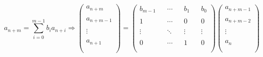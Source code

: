$$
	a_{n+m}=\sum_{i=0}^{m-1}b_ia_{n+i}\Rightarrow
	\left(
	\begin{matrix}
			a_{n+m}   \\\\
			a_{n+m-1} \\\\
			\vdots    \\\\
			a_{n+1}   \\\\
		\end{matrix}
	\right)
	=
	\left(
	\begin{matrix}
			b_{m-1} &  & \cdots &  & b_1    &  & b_0    \\\\
			1       &  & \cdots &  & 0      &  & 0      \\\\
			\vdots  &  & \ddots &  & \vdots &  & \vdots \\\\
			0       &  & \cdots &  & 1      &  & 0      \\\\
		\end{matrix}
	\right)
	\left(
	\begin{matrix}
			a_{n+m-1} \\\\
			a_{n+m-2} \\\\
			\vdots    \\\\
			a_n       \\\\
		\end{matrix}
	\right)
$$


